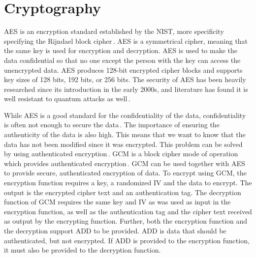 \section{Cryptography}
\label{sec:back_crypto}
\gls{AES} is an encryption standard established by the \gls{NIST}, more specificity specifying the Rijndael block cipher\,\cite{kumarvermaPerformanceAnalysisRC62012}. \gls{AES} is a symmetrical cipher, meaning that the same key is used for encryption and decryption. \gls{AES} is used to make the data confidential so that no one except the person with the key can access the unencrypted data. \gls{AES} produces \mbox{128-bit} encrypted cipher blocks and supports key sizes of 128 bits, 192 bits, or 256 bits. The security of \gls{AES} has been heavily researched since its introduction in the early 2000s, and literature has found it is well resistant to quantum attacks as well\,\cite{bonnetainQuantumSecurityAnalysis2019}.

While \gls{AES} is a good standard for the confidentiality of the data, confidentiality is often not enough to secure the data\,\cite{rosswallrabensteinWhenItComes2021}. The importance of ensuring the authenticity of the data is also high. This means that we want to know that the data has not been modified since it was encrypted. This problem can be solved by using authenticated encryption\,\cite{khovratovichAnswerWhyShould2013}. \gls{GCM} is a block cipher mode of operation which provides authenticated encryption\,\cite{mcgrewGaloisCounterMode2004}. \gls{GCM} can be used together with \gls{AES} to provide secure, authenticated encryption of data. To encrypt using \gls{GCM}, the encryption function requires a key, a randomized \gls{IV} and the data to encrypt. The output is the encrypted cipher text and an authentication tag. The decryption function of \gls{GCM} requires the same key and \gls{IV} as was used as input in the encryption function, as well as the authentication tag and the cipher text received as output by the encrypting function. Further, both the encryption function and the decryption support \gls{ADD} to be provided. \gls{ADD} is data that should be authenticated, but not encrypted. If \gls{ADD} is provided to the encryption function, it must also be provided to the decryption function.

